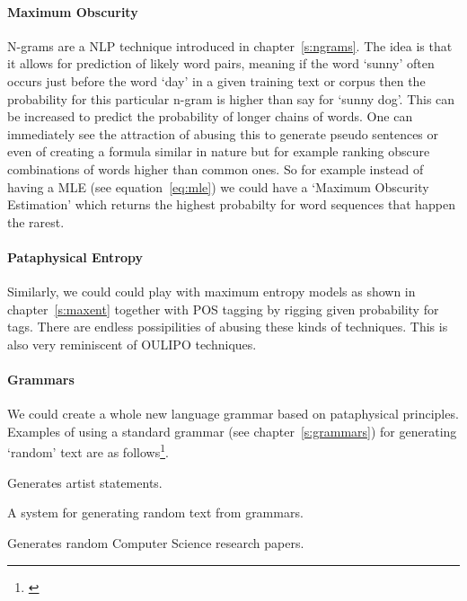\paragraph{Maximum Obscurity}
N-grams are a \ac{NLP} technique introduced in chapter~\ref{s:ngrams}. The idea is that it allows for prediction of likely word pairs, meaning if the word `sunny' often occurs just before the word `day' in a given training text or corpus then the probability for this particular n-gram is higher than say for `sunny dog'. This can be increased to predict the probability of longer chains of words. One can immediately see the attraction of abusing this to generate pseudo sentences or even of creating a formula similar in nature but for example ranking obscure combinations of words higher than common ones. So for example instead of having a \acf{MLE} (see equation~\ref{eq:mle}\sidepar{$\bm{\Sigma}$~\ref{eq:mle}}) we could have a `Maximum Obscurity Estimation' which returns the highest probabilty for word sequences that happen the rarest.

\paragraph{Pataphysical Entropy}
Similarly, we could could play with maximum entropy models as shown in chapter~\ref{s:maxent} together with \ac{POS} tagging by rigging given probability for tags. There are endless possipilities of abusing these kinds of techniques. This is also very reminiscent of \ac{OULIPO} techniques. 

\paragraph{Grammars}
We could create a whole new language grammar based on pataphysical principles. Examples of using a standard grammar (see chapter~\ref{s:grammars}) for generating `random' text are as follows\footnote{\autocite{Winter2016,Dada2016,Stribling2016}}.

\begin{adjustwidth}{1cm}{}
\begin{description}[leftmargin=3cm]
  \item[ArtyBollocks] Generates artist statements.
  \item[DadaEngine] A system for generating random text from grammars.
  \item[SciGen] Generates random Computer Science research papers.
\end{description}
\end{adjustwidth}

